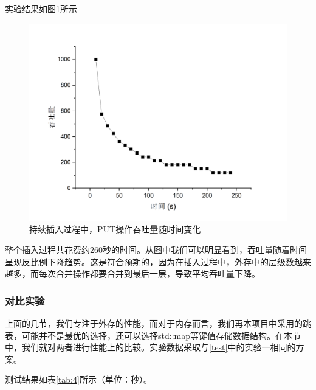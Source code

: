 \documentclass{article}
\begin{document}
实验结果如图\ref{fig:1}所示
\begin{figure}[h]
	\centering
	\includegraphics[scale=0.4]{graph1}
	\caption{持续插入过程中，PUT操作吞吐量随时间变化}
	\label{fig:1}
\end{figure}

整个插入过程共花费约260秒的时间。从图中我们可以明显看到，吞吐量随着时间呈现反比例下降趋势。这是符合预期的，因为在插入过程中，外存中的层级数越来越多，而每次合并操作都要合并到最后一层，导致平均吞吐量下降。

\subsubsection{对比实验}

上面的几节，我们专注于外存的性能，而对于内存而言，我们再本项目中采用的跳表，可能并不是最优的选择，还可以选择std::map等键值存储数据结构。在本节中，我们就对两者进行性能上的比较。实验数据采取与\ref{test}中的实验一相同的方案。

测试结果如表\ref{tab:4}所示（单位：秒）。
\end{document}
